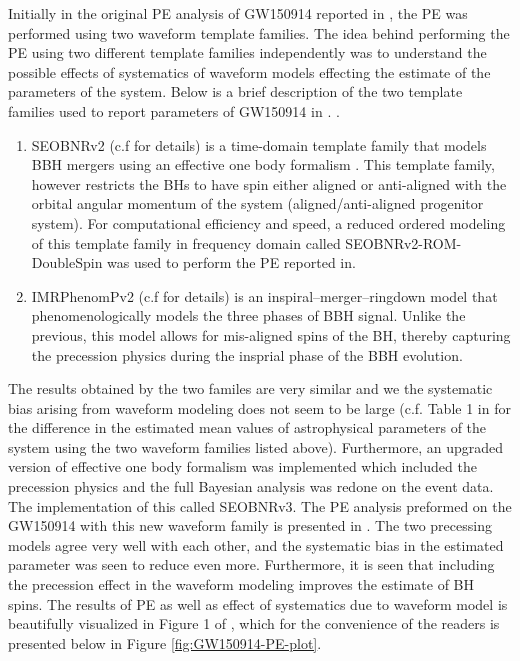 Initially in the original PE analysis of GW150914 reported in \cite{gw150914PE}, the PE was performed using two waveform template families. The idea behind performing the PE using two different template families independently was to understand the possible effects of systematics of waveform models effecting the estimate of the parameters of the system. Below is a brief description of the two template families used to report parameters of GW150914 in \cite{gw150914PE}.
.  
\begin{enumerate}
\item SEOBNRv2 (c.f \cite{SEOBNRv2-paper} for details) is a time-domain template family that models BBH mergers using an effective one body formalism \cite{the-damour-paper}. This template family, however restricts the BHs to have spin either aligned or anti-aligned with the orbital angular momentum of the system (aligned/anti-aligned progenitor system). For computational efficiency and speed, a reduced ordered modeling of this template family in frequency domain  
called SEOBNRv2-ROM-DoubleSpin was used to perform the PE reported in\cite{gw150914PE}.

\item IMRPhenomPv2  (c.f \cite{} for details)  is an inspiral–merger–ringdown model that phenomenologically models the three phases of BBH signal. Unlike the previous, this model allows for mis-aligned spins of the BH, thereby capturing the precession physics during the insprial phase of the BBH evolution.  
\end{enumerate}

The results obtained by the two familes are very similar and we the systematic bias arising from waveform modeling does not seem to be large (c.f. Table 1 in \cite{gw150914PE} for the difference in the estimated mean values of astrophysical parameters of the system using the two waveform families listed above). Furthermore, an upgraded version of effective one body formalism was implemented which included the precession physics and the full Bayesian analysis was redone on the event data. The implementation of this called SEOBNRv3. The PE analysis preformed on the GW150914 with this new waveform family is presented in \cite{gw150914PEseobnrv3}. The two precessing models agree very well with each other, and the systematic bias in the estimated parameter was seen to reduce even more. Furthermore, it is seen that including the precession effect in the waveform modeling improves the estimate of BH spins. The results of PE as well as effect of systematics due to waveform model is beautifully visualized in Figure 1 of \cite{gw150914PEseobnrv3}, which for the convenience of the readers is presented below in Figure \ref{fig:GW150914-PE-plot}.

